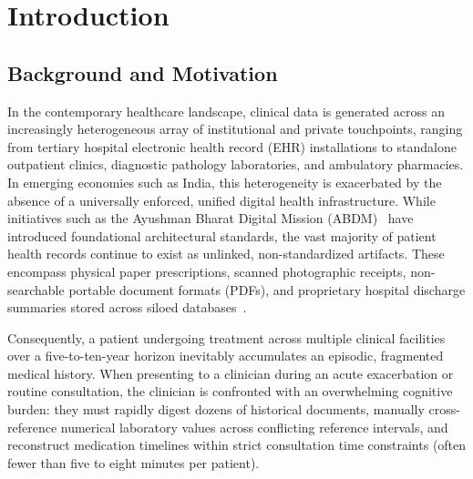 \chapter{Introduction}
\label{chap:introduction}

\section{Background and Motivation}
\label{sec:intro_background}

In the contemporary healthcare landscape, clinical data is generated across an increasingly heterogeneous array of institutional and private touchpoints, ranging from tertiary hospital electronic health record (EHR) installations to standalone outpatient clinics, diagnostic pathology laboratories, and ambulatory pharmacies. In emerging economies such as India, this heterogeneity is exacerbated by the absence of a universally enforced, unified digital health infrastructure. While initiatives such as the Ayushman Bharat Digital Mission (ABDM)~\cite{nha2022abdm} have introduced foundational architectural standards, the vast majority of patient health records continue to exist as unlinked, non-standardized artifacts. These encompass physical paper prescriptions, scanned photographic receipts, non-searchable portable document formats (PDFs), and proprietary hospital discharge summaries stored across siloed databases~\cite{jensen2012mining}. 

Consequently, a patient undergoing treatment across multiple clinical facilities over a five-to-ten-year horizon inevitably accumulates an episodic, fragmented medical history. When presenting to a clinician during an acute exacerbation or routine consultation, the clinician is confronted with an overwhelming cognitive burden: they must rapidly digest dozens of historical documents, manually cross-reference numerical laboratory values across conflicting reference intervals, and reconstruct medication timelines within strict consultation time constraints (often fewer than five to eight minutes per patient).

